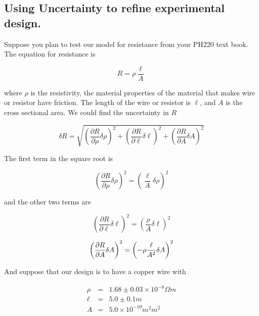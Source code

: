 \subsection{Using Uncertainty to refine experimental design.}

Suppose you plan to test our model for resistance from your PH220 text book. The equation for resistance is 

\begin{equation*}
	R=\rho \frac{\ell }{A}
\end{equation*}

where $\rho $ is the resistivity, the material properties of the material that makes wire or resistor have friction. The length of the wire or resistor is $\ell $, and $A$ is the cross sectional area. We could find the uncertainty in $R$

\begin{equation*}
	\delta R=\sqrt{\left( \frac{\partial R}{\partial \rho }\delta \rho \right)
		^{2}+\left( \frac{\partial R}{\partial \ell }\delta \ell \right) ^{2}+\left( 
		\frac{\partial R}{\partial A}\delta A\right) ^{2}}
\end{equation*}

\noindent The first term in the square root is 

\begin{equation*}
	\left( \frac{\partial R}{\partial \rho }\delta \rho \right) ^{2}=\left( 
	\frac{\ell }{A}\delta \rho \right) ^{2}
\end{equation*}

\noindent and the other two terms are 

\begin{equation*}
	\left( \frac{\partial R}{\partial \ell }\delta \ell \right) ^{2}=\left( 
	\frac{\rho }{A}\delta \ell \right) ^{2}
\end{equation*}

\begin{equation*}
	\left( \frac{\partial R}{\partial A}\delta A\right) ^{2}=\left( -\rho \frac{%
		\ell }{A^{2}}\delta A\right) ^{2}
\end{equation*}

And suppose that our design is to have a copper wire with 

\begin{eqnarray*}
	\rho &=&1.68\pm 0.03\times 10^{-8}\unit{\Omega}\unit{m} \\
	\ell &=&5.0\pm 0.1\unit{m} \\
	A &=&5.0\times 10^{-10}\unit{m}^{2}\unit{m}^{2}
\end{eqnarray*}

